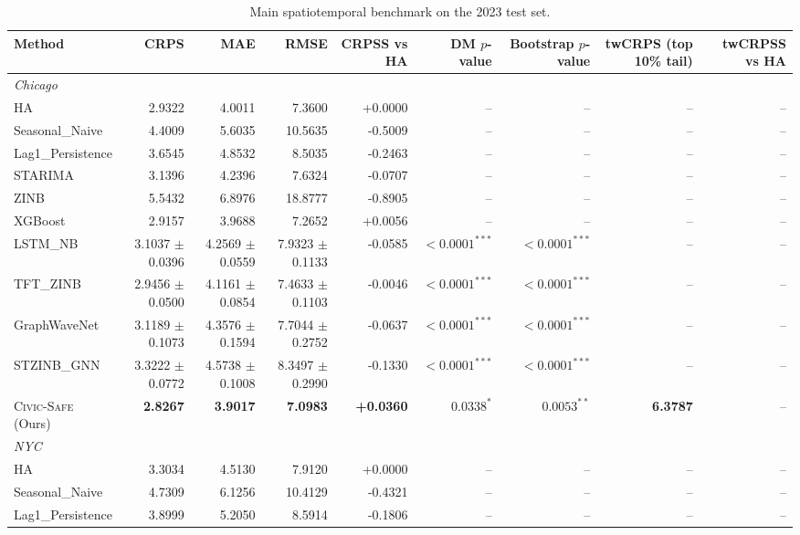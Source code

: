 \begin{table}[htbp]
  \centering
  \caption{Main spatiotemporal benchmark on the 2023 test set.}
  \label{tab:main_results}
  \begin{tabular}{l r r r r r r r r}
    \toprule
    \textbf{Method} & \textbf{CRPS} & \textbf{MAE} & \textbf{RMSE} & \textbf{CRPSS vs HA} & \textbf{DM $p$-value} & \textbf{Bootstrap $p$-value} & \textbf{twCRPS (top 10\% tail)} & \textbf{twCRPSS vs HA} \\
    \midrule
    \multicolumn{9}{l}{\textit{Chicago}} \\
    \midrule
    HA & 2.9322 & 4.0011 & 7.3600 & +0.0000 & -- & -- & -- & -- \\
    Seasonal\_Naive & 4.4009 & 5.6035 & 10.5635 & -0.5009 & -- & -- & -- & -- \\
    Lag1\_Persistence & 3.6545 & 4.8532 & 8.5035 & -0.2463 & -- & -- & -- & -- \\
    STARIMA & 3.1396 & 4.2396 & 7.6324 & -0.0707 & -- & -- & -- & -- \\
    ZINB & 5.5432 & 6.8976 & 18.8777 & -0.8905 & -- & -- & -- & -- \\
    XGBoost & 2.9157 & 3.9688 & 7.2652 & +0.0056 & -- & -- & -- & -- \\
    LSTM\_NB & 3.1037 $\pm$ 0.0396 & 4.2569 $\pm$ 0.0559 & 7.9323 $\pm$ 0.1133 & -0.0585 & \textbf{$<0.0001^{***}$} & \textbf{$<0.0001^{***}$} & -- & -- \\
    TFT\_ZINB & 2.9456 $\pm$ 0.0500 & 4.1161 $\pm$ 0.0854 & 7.4633 $\pm$ 0.1103 & -0.0046 & $<0.0001^{***}$ & $<0.0001^{***}$ & -- & -- \\
    GraphWaveNet & 3.1189 $\pm$ 0.1073 & 4.3576 $\pm$ 0.1594 & 7.7044 $\pm$ 0.2752 & -0.0637 & $<0.0001^{***}$ & $<0.0001^{***}$ & -- & -- \\
    STZINB\_GNN & 3.3222 $\pm$ 0.0772 & 4.5738 $\pm$ 0.1008 & 8.3497 $\pm$ 0.2990 & -0.1330 & $<0.0001^{***}$ & $<0.0001^{***}$ & -- & -- \\
    \textsc{Civic-Safe} (Ours) & \textbf{2.8267} & \textbf{3.9017} & \textbf{7.0983} & \textbf{+0.0360} & $0.0338^{*}$ & $0.0053^{**}$ & \textbf{6.3787} & -- \\
    \midrule
    \multicolumn{9}{l}{\textit{NYC}} \\
    \midrule
    HA & 3.3034 & 4.5130 & 7.9120 & +0.0000 & -- & -- & -- & -- \\
    Seasonal\_Naive & 4.7309 & 6.1256 & 10.4129 & -0.4321 & -- & -- & -- & -- \\
    Lag1\_Persistence & 3.8999 & 5.2050 & 8.5914 & -0.1806 & -- & -- & -- & -- \\

\end{tabular}
\end{table}

